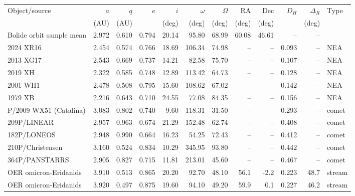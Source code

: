 \begin{tabular}{lrrrrrrrrrrl}
\toprule
Object/source & $a$ & $q$ & $e$ & $i$ & $\omega$ & $\Omega$ & RA & Dec & $D_H$ & $\Delta_R$ & Type \\
 & (AU) & (AU) & & (deg) & (deg) & (deg) & (deg) & (deg) & & (deg) & \\
\midrule
Bolide orbit sample mean & 2.972 & 0.610 & 0.794 & 20.14 & 95.80 & 68.99 & 60.08 & 46.61 & -- & -- &  \\
\midrule
2024 XR16 & 2.454 & 0.574 & 0.766 & 18.69 & 106.34 & 74.98 & -- & -- & 0.093 & -- & NEA \\
2013 XG17 & 2.543 & 0.669 & 0.737 & 14.21 & 82.58 & 75.70 & -- & -- & 0.107 & -- & NEA \\
2019 XH & 2.322 & 0.585 & 0.748 & 12.89 & 113.42 & 64.73 & -- & -- & 0.128 & -- & NEA \\
2001 WH1 & 2.478 & 0.508 & 0.795 & 15.60 & 108.62 & 67.02 & -- & -- & 0.142 & -- & NEA \\
1979 XB & 2.216 & 0.643 & 0.710 & 24.55 & 77.08 & 84.35 & -- & -- & 0.156 & -- & NEA \\
\midrule
P/2009 WX51 (Catalina) & 3.083 & 0.802 & 0.740 & 9.60 & 118.31 & 31.50 & -- & -- & 0.293 & -- & comet \\
209P/LINEAR & 2.957 & 0.963 & 0.674 & 21.29 & 152.48 & 62.74 & -- & -- & 0.408 & -- & comet \\
182P/LONEOS & 2.948 & 0.990 & 0.664 & 16.23 & 54.25 & 72.43 & -- & -- & 0.412 & -- & comet \\
210P/Christensen & 3.160 & 0.524 & 0.834 & 10.29 & 345.95 & 93.80 & -- & -- & 0.442 & -- & comet \\
364P/PANSTARRS & 2.905 & 0.827 & 0.715 & 11.81 & 213.01 & 45.60 & -- & -- & 0.467 & -- & comet \\
\midrule
OER omicron-Eridanids                        & 3.910 & 0.513 & 0.865 & 20.20 & 92.70 & 48.10 & 56.1 & -2.2 & 0.223 & 48.7 & stream \\
OER omicron-Eridanids                        & 3.920 & 0.497 & 0.875 & 19.60 & 94.10 & 49.20 & 59.9 & 0.1 & 0.227 & 46.2 & stream \\

\end{tabular}
